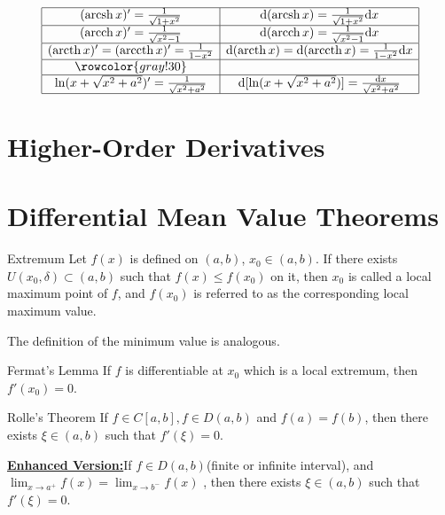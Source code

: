 \documentclass[11pt]{../../TexTemplate/elegantbook}
\begin{document}
\[\begin{array}{|c|c|}
\hline
(\mathrm{arcsh}\,x)'=\frac{1}{\sqrt{1+x^2}} & \mathrm{d}(\mathrm{arcsh}\,x)=\frac{1}{\sqrt{1+x^2}}\mathrm{d}x \\
\hline
(\mathrm{arcch}\,x)'=\frac{1}{\sqrt{x^2-1}} & \mathrm{d}(\mathrm{arcch}\,x)=\frac{1}{\sqrt{x^2-1}}\mathrm{d}x \\
\hline
(\mathrm{arcth}\,x)'=(\mathrm{arccth}\,x)'=\frac{1}{1-x^2} & 
    \mathrm{d}(\mathrm{arcth}\,x)=\mathrm{d}(\mathrm{arccth}\,x)=\frac{1}{1-x^2}\mathrm{d}x \\ \hline
\rowcolor{gray!30} & \\ \hline
\ln(x+\sqrt{x^2+a^2})'=\frac{1}{\sqrt{x^2+a^2}} & \mathrm{d}[\ln(x+\sqrt{x^2+a^2})]=\frac{\mathrm{d}x}{\sqrt{x^2+a^2}} \\
\hline
\end{array}
\]

\section{Higher-Order Derivatives}

\section{Differential Mean Value Theorems}
\begin{definition}{Extremum}
    Let \(f(x)\) is defined on \((a,b)\), \(x_{0}\in (a,b)\).
    If there exists \(U(x_{0}, \delta)\subset (a,b)\) such that \(f(x)\leqslant f(x_{0})\) on it,
    then \(x_{0}\) is called a local maximum point of \(f\),
    and \(f(x_{0})\) is referred to as the corresponding local maximum value.

    The definition of the minimum value is analogous.
\end{definition}

\begin{lemma}{Fermat's Lemma}
    If \(f\) is differentiable at \(x_{0}\) which is a local extremum, then \(f'(x_{0}) = 0\).
\end{lemma}

\begin{theorem}{Rolle's Theorem}
    If \(f\in C[a,b], f\in D(a,b)\) and \(f(a) = f(b)\), then there exists \(\xi\in (a,b)\) such that \(f'(\xi) = 0\).

    \underline{\textbf{Enhanced Version:}}If \(f\in D(a,b)\)(finite or infinite interval), 
    and \(\lim_{x \to a^{+}} f(x) = \lim_{x \to b^{-}} f(x) \) , 
    then there exists \(\xi\in (a,b)\) such that \(f'(\xi) = 0\).
\end{theorem}
\end{document}
